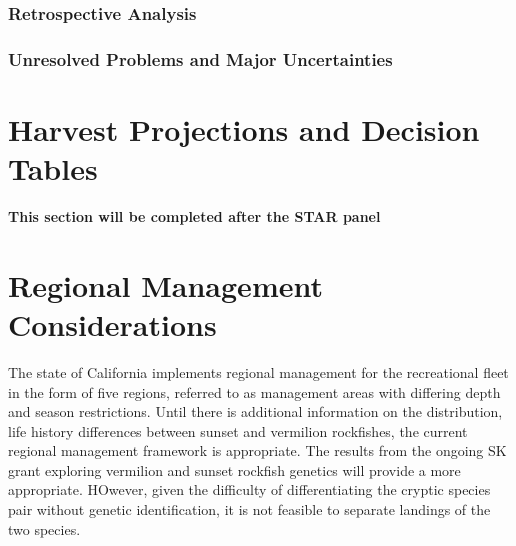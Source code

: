 \documentclass[11pt,
  english,
  a4paper,
]{article}
\begin{document}

\hypertarget{retrospective-analysis}{%
\subsubsection{Retrospective Analysis}\label{retrospective-analysis}}

\leavevmode\tagmcend\tagstructend


\hypertarget{unresolved-problems-and-major-uncertainties-1}{%
\subsubsection{Unresolved Problems and Major Uncertainties}\label{unresolved-problems-and-major-uncertainties-1}}

\leavevmode\tagmcend\tagstructend


\hypertarget{harvest-projections-and-decision-tables}{%
\section{Harvest Projections and Decision Tables}\label{harvest-projections-and-decision-tables}}

\leavevmode\tagmcend\tagstructend

\textbf{This section will be completed after the STAR panel}


\hypertarget{regional-management-considerations}{%
\section{Regional Management Considerations}\label{regional-management-considerations}}

\leavevmode\tagmcend\tagstructend

The state of California implements regional management for the recreational fleet in the form of five regions, referred to as management areas with differing depth and season restrictions. Until there is additional information on the distribution, life history differences between sunset and vermilion rockfishes, the current regional management framework is appropriate. The results from the ongoing SK grant exploring vermilion and sunset rockfish genetics will provide a more appropriate. HOwever, given the difficulty of differentiating the cryptic species pair without genetic identification, it is not feasible to separate landings of the two species.
\end{document}
